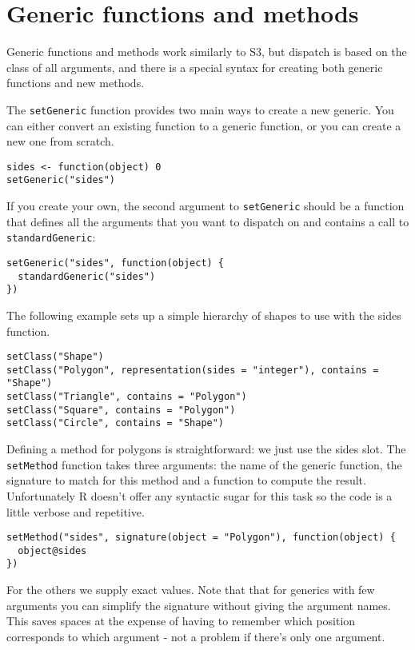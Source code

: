 \section{Generic functions and methods}

Generic functions and methods work similarly to S3, but dispatch is
based on the class of all arguments, and there is a special syntax for
creating both generic functions and new methods.

The \texttt{setGeneric} function provides two main ways to create a new
generic. You can either convert an existing function to a generic
function, or you can create a new one from scratch.

\begin{verbatim}
sides <- function(object) 0
setGeneric("sides")
\end{verbatim}

If you create your own, the second argument to \texttt{setGeneric}
should be a function that defines all the arguments that you want to
dispatch on and contains a call to \texttt{standardGeneric}:

\begin{verbatim}
setGeneric("sides", function(object) {
  standardGeneric("sides")
})
\end{verbatim}

The following example sets up a simple hierarchy of shapes to use with
the sides function.

\begin{verbatim}
setClass("Shape")
setClass("Polygon", representation(sides = "integer"), contains = "Shape")
setClass("Triangle", contains = "Polygon")
setClass("Square", contains = "Polygon")
setClass("Circle", contains = "Shape")
\end{verbatim}

Defining a method for polygons is straightforward: we just use the sides
slot. The \texttt{setMethod} function takes three arguments: the name of
the generic function, the signature to match for this method and a
function to compute the result. Unfortunately R doesn't offer any
syntactic sugar for this task so the code is a little verbose and
repetitive.

\begin{verbatim}
setMethod("sides", signature(object = "Polygon"), function(object) {
  object@sides
})
\end{verbatim}

For the others we supply exact values. Note that that for generics with
few arguments you can simplify the signature without giving the argument
names. This saves spaces at the expense of having to remember which
position corresponds to which argument - not a problem if there's only
one argument.

